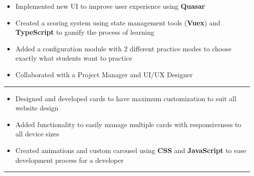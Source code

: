\begin{itemize}
    \item Implemented new UI to improve user experience using \textbf{Quasar}
    \item Created a scoring system using state management tools (\textbf{Vuex}) and \textbf{TypeScript} to gamify the process of learning
    \item Added a configuration module with 2 different practice modes to choose exactly what students want to practice
    \item Collaborated with a Project Manager and UI/UX Designer
\end{itemize}

\rule{\linewidth}{0.2pt}



\begin{itemize}
    \item Designed and developed cards to have maximum customization to suit all website design
    \item Added functionality to easily manage multiple cards with responsiveness to all device sizes
    \item Created animations and custom carousel using \textbf{CSS} and \textbf{JavaScript} to ease development process for a developer
\end{itemize}

\rule{\linewidth}{0.2pt}

